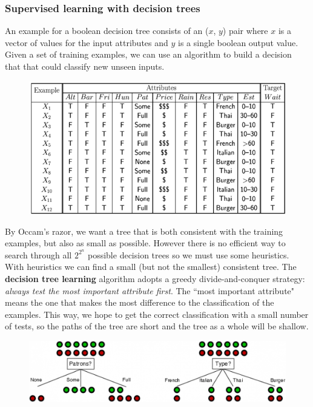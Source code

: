 \documentclass{article}
\begin{document}
\subsubsection{Supervised learning with decision trees}
An example for a boolean decision tree consists of an ($x$, $y$) pair where $x$ is a vector of values for the input attributes and $y$ is a single boolean output value. Given a set of training examples, we can use an algorithm to build a decision that that could classify new unseen inputs. 
\begin{figure}[H]
\centering
\includegraphics[width=1\textwidth, keepaspectratio]{imgs/decision-tree-table.png}
\end{figure}
\noindent
By Occam's razor, we want a tree that is both consistent with the training examples, but also as small as possible. However there is no efficient way to search through all $2^{2^{n}}$ possible decision trees so we must use some heuristics. With heuristics we can find a small (but not the smallest) consistent tree. The \textbf{decision tree learning} algorithm adopts a greedy divide-and-conquer strategy: \textit{always test the most important attribute first}. The ``most important attribute" means the one that makes the most difference to the classification of the examples. This way, we hope to get the correct classification with a small number of tests, so the paths of the tree are short and the tree as a whole will be shallow.
\begin{figure}[H]
\centering
\includegraphics[width=1\textwidth, keepaspectratio]{imgs/decision-tree-split.png}
\end{figure}
\end{document}
